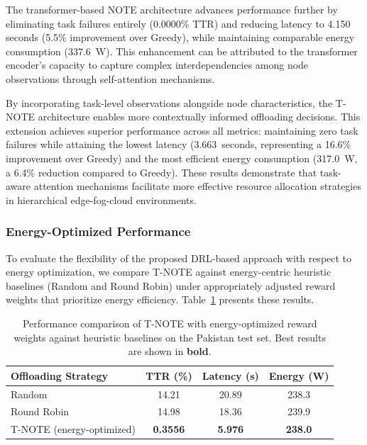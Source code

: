 \documentclass[preprint,3p,authoryear]{elsarticle}
\begin{document}
The transformer-based NOTE architecture advances performance further by eliminating task failures entirely (0.0000\% TTR) and reducing latency to 4.150 seconds (5.5\% improvement over Greedy), while maintaining comparable energy consumption (337.6~W). This enhancement can be attributed to the transformer encoder's capacity to capture complex interdependencies among node observations through self-attention mechanisms.

By incorporating task-level observations alongside node characteristics, the T-NOTE architecture enables more contextually informed offloading decisions. This extension achieves superior performance across all metrics: maintaining zero task failures while attaining the lowest latency (3.663~seconds, representing a 16.6\% improvement over Greedy) and the most efficient energy consumption (317.0~W, a 6.4\% reduction compared to Greedy). These results demonstrate that task-aware attention mechanisms facilitate more effective resource allocation strategies in hierarchical edge-fog-cloud environments.

\subsubsection{Energy-Optimized Performance}\label{sec:energy_consideration}

To evaluate the flexibility of the proposed DRL-based approach with respect to energy optimization, we compare T-NOTE against energy-centric heuristic baselines (Random and Round Robin) under appropriately adjusted reward weights that prioritize energy efficiency. Table~\ref{tab:energy_comparison} presents these results.

\begin{table}[htbp]
\centering
\begin{tabular}{lccc}
\toprule
\textbf{Offloading Strategy} & \textbf{TTR (\%)} & \textbf{Latency (s)} & \textbf{Energy (W)} \\
\midrule
Random 
 & 14.21
 & 20.89
 & 238.3 \\
Round Robin 
 & 14.98
 & 18.36
 & 239.9 \\
\midrule
T-NOTE (energy-optimized)
 & \textbf{0.3556} 
 & \textbf{5.976} 
 & \textbf{238.0} \\
\bottomrule
\end{tabular}
\caption{Performance comparison of T-NOTE with energy-optimized reward weights against heuristic baselines on the Pakistan test set. Best results are shown in \textbf{bold}.}
\label{tab:energy_comparison}
\end{table}
\end{document}

